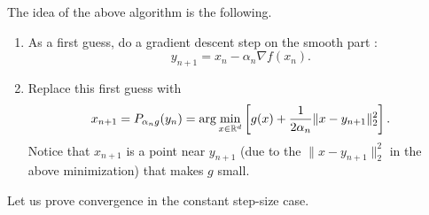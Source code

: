      The idea of the above algorithm is the following.
     \begin{enumerate}
         \item As a first guess, do a gradient descent step on the smooth part :
               \begin{equation}
                   y_{n+1} =x_n - \alpha_n\nabla f(x_n).
               \end{equation}
         \item Replace this first guess with
               \begin{equation}
                   x_{n+1} = P_{\alpha_n g}(y_n) = \arg\min_{x\in \mathbb{R}^{d}}\left[ g(x) + \frac{1}{2\alpha_n}\|x-y_{n+1}\|_2^2 \right].
               \end{equation}
               Notice that $x_{n+1}$ is a point near $y_{n+1}$ (due to the $\|x-y_{n+1}\|_2^2$ in the above minimization) that makes $g$ small.
     \end{enumerate}
 
     Let us prove convergence in the constant step-size case.
 
 
